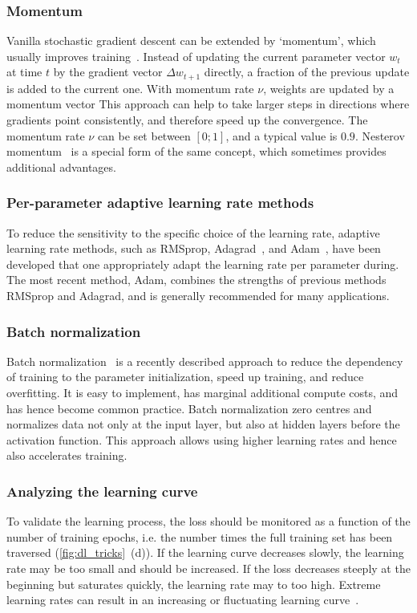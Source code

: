 \subsubsection{Momentum}
Vanilla stochastic gradient descent can be extended by `momentum', which usually improves training~\citep{sutskever_training_2013}. Instead of updating the current parameter vector $w_t$ at time $t$ by the gradient vector $\Delta w_{t+1}$ directly, a fraction of the previous update is added to the current one. With momentum rate $\nu$, weights are updated by a momentum vector  This approach can help to take larger steps in directions where gradients point consistently, and therefore speed up the convergence. The momentum rate $\nu$ can be set between $[0;1]$, and a typical value is $0.9$. Nesterov momentum~\citep{nesterov_method_1983,nesterov_introductory_2013} is a special form of the same concept, which sometimes provides additional advantages.

\subsubsection{Per-parameter adaptive learning rate methods}
To reduce the sensitivity to the specific choice of the learning rate, adaptive learning rate methods, such as RMSprop, Adagrad~\citep{duchi_adaptive_2011}, and Adam~\citep{kingma_adam:_2014}, have been developed that one appropriately adapt the learning rate per parameter during. The most recent method, Adam, combines the strengths of previous methods RMSprop and Adagrad, and is generally recommended for many applications.

\subsubsection{Batch normalization}
Batch normalization~\citep{ioffe_batch_2015} is a recently described approach to reduce the dependency of training to the parameter initialization, speed up training, and reduce overfitting. It is easy to implement, has marginal additional compute costs, and has hence become common practice. Batch normalization zero centres and normalizes data not only at the input layer, but also at hidden layers before the activation function. This approach allows using higher learning rates and hence also accelerates training.

\subsubsection{Analyzing the learning curve}
To validate the learning process, the loss should be monitored as a function of the number of training epochs, i.e. the number times the full training set has been traversed (\autoref{fig:dl_tricks}~(d)). If the learning curve decreases slowly, the learning rate may be too small and should be increased. If the loss decreases steeply at the beginning but saturates quickly, the learning rate may to too high. Extreme learning rates can result in an increasing or fluctuating learning curve~\citep{bengio_practical_2012,karpathy_cs231n_2016}.

